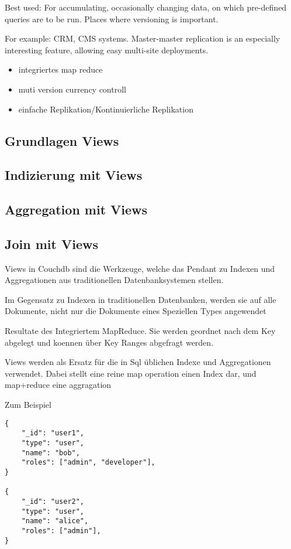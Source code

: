 Best used: For accumulating, occasionally changing data, on which pre-defined queries are to be run. Places where versioning is important.

For example: CRM, CMS systems. Master-master replication is an especially interesting feature, allowing easy multi-site deployments. 


\begin{itemize}
\item integriertes map reduce
\item muti version currency controll
\item einfache Replikation/Kontinuierliche Replikation
\end{itemize}


\subsection{Grundlagen Views}
\subsection{Indizierung mit Views}
\subsection{Aggregation mit Views}
\subsection{Join mit Views}



Views in Couchdb sind die Werkzeuge,
welche das Pendant zu Indexen und Aggregationen
aus traditionellen Datenbanksystemen stellen.

Im Gegensatz zu Indexen in traditionellen Datenbanken, werden sie auf alle Dokumente,
nicht nur die Dokumente eines Speziellen Types angewendet


Resultate des Integriertem MapReduce.
Sie werden geordnet nach dem Key abgelegt und koennen über Key Ranges abgefragt werden.


Views werden als Ersatz für die in Sql üblichen Indexe und Aggregationen verwendet.
Dabei stellt eine  reine map operation einen Index dar, und map+reduce eine aggragation

\newpage
Zum Beispiel
\begin{lstlisting}
{
    "_id": "user1",
    "type": "user",
    "name": "bob",
    "roles": ["admin", "developer"],
}

{
    "_id": "user2",
    "type": "user",
    "name": "alice",
    "roles": ["admin"],
}
\end{lstlisting}


